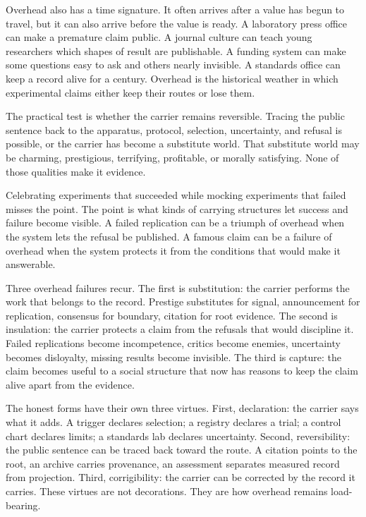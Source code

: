 \begin{chapteressay}
Overhead also has a time signature. It often arrives after a value has
begun to travel, but it can also arrive before the value is ready. A
laboratory press office can make a premature claim public. A journal
culture can teach young researchers which shapes of result are
publishable. A funding system can make some questions easy to ask and
others nearly invisible. A standards office can keep a record alive for a
century. Overhead is the historical weather in which experimental claims
either keep their routes or lose them.

The practical test is whether the carrier remains reversible. Tracing the
public sentence back to the apparatus, protocol, selection, uncertainty,
and refusal is possible, or the carrier has become a substitute world.
That substitute world may be charming, prestigious, terrifying,
profitable, or morally satisfying. None of those qualities make it
evidence.

Celebrating experiments that succeeded while mocking experiments that
failed misses the point. The point is what kinds of carrying structures
let success and failure become visible. A failed replication can be a triumph of overhead
when the system lets the refusal be published. A famous claim can be a
failure of overhead when the system protects it from the conditions that
would make it answerable.

Three overhead failures recur. The first is substitution: the carrier
performs the work that belongs to the record. Prestige substitutes for signal, announcement for replication,
consensus for boundary, citation for root evidence. The second is
insulation: the carrier protects a claim from the refusals that would
discipline it. Failed replications become incompetence, critics become
enemies, uncertainty becomes disloyalty, missing results become invisible.
The third is capture: the claim becomes useful to a social structure that
now has reasons to keep the claim alive apart from the evidence.

The honest forms have their own three virtues. First, declaration: the
carrier says what it adds. A trigger declares selection; a registry
declares a trial; a control chart declares limits; a standards lab
declares uncertainty. Second, reversibility: the public sentence can be
traced back toward the route. A citation points to the root, an archive
carries provenance, an assessment separates measured record from
projection. Third, corrigibility: the carrier can be corrected by the
record it carries. These virtues are not decorations. They are how
overhead remains load-bearing.


\end{chapteressay}
